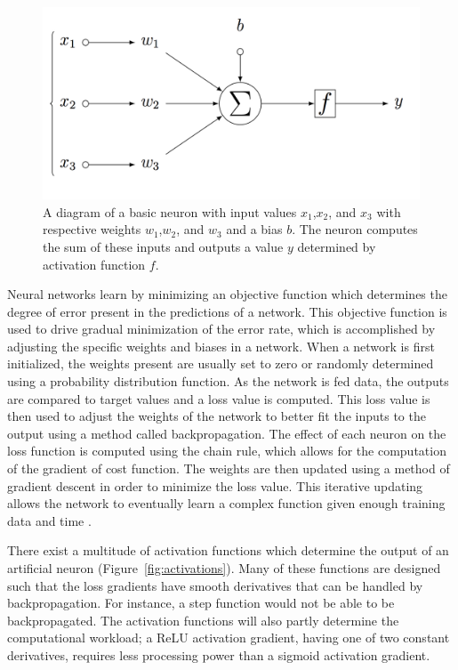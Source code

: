 \documentclass[12pt,oneside,onecolumn,a4paper]{article}
\begin{document}
\begin{figure}[H]
\begin{center}
\includegraphics[width=0.8\columnwidth]{figures/neuron}
\caption{A diagram of a basic neuron with input values $x_{1}$,$x_{2}$, and $x_{3}$ with respective weights $w_{1}$,$w_{2}$, and $w_{3}$ and a bias $b$. The neuron computes the sum of these inputs and outputs a value $y$ determined by activation function $f$. \label{fig:neuron}}
\end{center}
\end{figure}

Neural networks learn by minimizing an objective function which determines the degree of error present in the predictions of a network. This objective function is used to drive gradual minimization of the error rate, which is accomplished by adjusting the specific weights and biases in a network. When a network is first initialized, the weights present are usually set to zero or randomly determined using a probability distribution function. As the network is fed data, the outputs are compared to target values and a loss value is computed. This loss value is then used to adjust the weights of the network to better fit the inputs to the output using a method called backpropagation. The effect of each neuron on the loss function is computed using the chain rule, which allows for the computation of the gradient of cost function. The weights are then updated using a method of gradient descent in order to minimize the loss value. This iterative updating allows the network to eventually learn a complex function given enough training data and time \citep{Zilouchian2001FundamentalsON}. 

There exist a multitude of activation functions which determine the output of an artificial neuron (Figure~\ref{fig:activations}). Many of these functions are designed such that the loss gradients have smooth derivatives that can be handled by backpropagation. For instance, a step function would not be able to be backpropagated. The activation functions will also partly determine the computational workload; a ReLU activation gradient, having one of two constant derivatives, requires less processing power than a sigmoid activation gradient.
\end{document}
